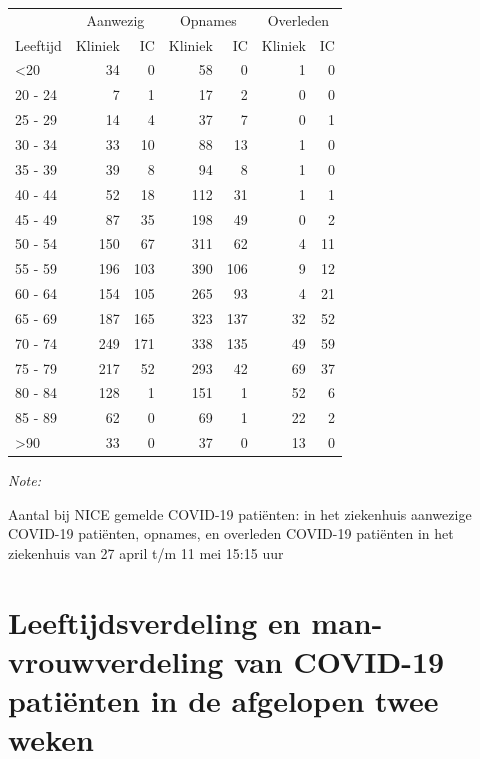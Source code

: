 \documentclass[
  english,
  man,floatsintext]{apa6}
\begin{document}
\begin{table}
\centering\begingroup\fontsize{10}{12}\selectfont

\begin{threeparttable}
\begin{tabular}{lrrrrrr}
\toprule
\multicolumn{1}{c}{ } & \multicolumn{2}{c}{Aanwezig} & \multicolumn{2}{c}{Opnames} & \multicolumn{2}{c}{Overleden} \\
\cmidrule(l{3pt}r{3pt}){2-3} \cmidrule(l{3pt}r{3pt}){4-5} \cmidrule(l{3pt}r{3pt}){6-7}
Leeftijd & Kliniek & IC & Kliniek & IC & Kliniek & IC\\
\midrule
<20 & 34 & 0 & 58 & 0 & 1 & 0\\
20 - 24 & 7 & 1 & 17 & 2 & 0 & 0\\
25 - 29 & 14 & 4 & 37 & 7 & 0 & 1\\
30 - 34 & 33 & 10 & 88 & 13 & 1 & 0\\
35 - 39 & 39 & 8 & 94 & 8 & 1 & 0\\
40 - 44 & 52 & 18 & 112 & 31 & 1 & 1\\
45 - 49 & 87 & 35 & 198 & 49 & 0 & 2\\
50 - 54 & 150 & 67 & 311 & 62 & 4 & 11\\
55 - 59 & 196 & 103 & 390 & 106 & 9 & 12\\
60 - 64 & 154 & 105 & 265 & 93 & 4 & 21\\
65 - 69 & 187 & 165 & 323 & 137 & 32 & 52\\
70 - 74 & 249 & 171 & 338 & 135 & 49 & 59\\
75 - 79 & 217 & 52 & 293 & 42 & 69 & 37\\
80 - 84 & 128 & 1 & 151 & 1 & 52 & 6\\
85 - 89 & 62 & 0 & 69 & 1 & 22 & 2\\
>90 & 33 & 0 & 37 & 0 & 13 & 0\\
\bottomrule
\end{tabular}
\begin{tablenotes}
\item \textit{Note: } 
\item Aantal bij NICE gemelde COVID-19 patiënten: in het ziekenhuis aanwezige COVID-19 patiënten, opnames, en overleden COVID-19 patiënten in het ziekenhuis van 27 april t/m 11 mei 15:15 uur
\end{tablenotes}
\end{threeparttable}
\endgroup{}
\end{table}

\newpage

\hypertarget{leeftijdsverdeling-en-man-vrouwverdeling-van-covid-19-patiuxebnten-in-de-afgelopen-twee-weken}{%
\section{Leeftijdsverdeling en man-vrouwverdeling van COVID-19 patiënten in de afgelopen twee weken}\label{leeftijdsverdeling-en-man-vrouwverdeling-van-covid-19-patiuxebnten-in-de-afgelopen-twee-weken}}
\end{document}
